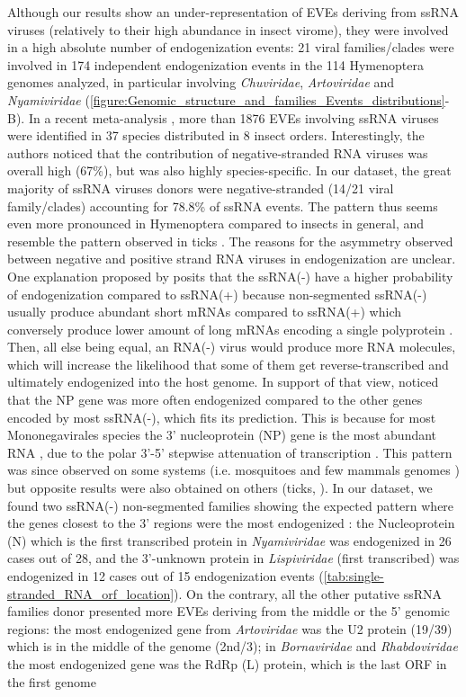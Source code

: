 Although our results show an under-representation of EVEs deriving from ssRNA viruses (relatively to their high abundance in insect virome), they were involved in a high absolute number of endogenization events: 21 viral families/clades were involved in 174 independent endogenization events in the 114 Hymenoptera genomes analyzed, in particular involving \textit{Chuviridae}, \textit{Artoviridae} and \textit{Nyamiviridae} (\figurename{\ref{figure:Genomic_structure_and_families_Events_distributions}-B}). In a recent meta-analysis \citep{gilbert_diversity_2022}, more than 1876 EVEs involving ssRNA viruses were identified in 37 species distributed in 8 insect orders. Interestingly, the authors noticed that the contribution of negative-stranded RNA viruses was overall high (67\%), but was also highly species-specific. In our dataset, the great majority of ssRNA viruses donors were negative-stranded (14/21 viral family/clades) accounting for 78.8\% of ssRNA events. The pattern thus seems even more pronounced in Hymenoptera compared to insects in general, and resemble the pattern observed in ticks \citep{russo_novel_2019}. The reasons for the asymmetry observed between negative and positive strand RNA viruses in endogenization are unclear. One explanation proposed by \citep{holmes_evolution_2011} posits that the ssRNA(-) have a higher probability of endogenization compared to ssRNA(+) because non-segmented ssRNA(-) usually produce abundant short mRNAs compared to ssRNA(+) which conversely produce lower amount of long mRNAs encoding a single polyprotein \citep{modrow_viruses_2013}. Then, all else being equal, an RNA(-) virus would produce more RNA molecules, which will increase the likelihood that some of them get reverse-transcribed and ultimately endogenized into the host genome. In support of that view, \citep{holmes_evolution_2011} noticed that the NP gene was more often endogenized compared to the other genes encoded by most ssRNA(-), which fits its prediction. This is because  for most Mononegavirales species the 3' nucleoprotein (NP) gene is the most abundant RNA \citep{compans_transcription_2004}, due to the polar 3'-5' stepwise attenuation of transcription \citep{compans_transcription_2004}. This pattern was since observed on some systems (i.e. mosquitoes and few mammals genomes \citep{katzourakis_endogenous_2010}) but opposite results were also obtained on others (ticks, \citep{russo_novel_2019}). In our dataset, we found two ssRNA(-) non-segmented families showing the expected pattern where the genes closest to the 3' regions were the most endogenized : the Nucleoprotein (N) which is the first transcribed protein in \textit{Nyamiviridae} was endogenized in 26 cases out of 28, and the 3'-unknown protein in \textit{Lispiviridae} (first transcribed) was endogenized in 12 cases out of 15 endogenization events (\tablename{\ref{tab:single-stranded_RNA_orf_location}}). On the contrary, all the other putative  ssRNA families donor presented more EVEs deriving from the middle or the 5' genomic regions: the most endogenized gene from \textit{\textit{Artoviridae}} was the U2 protein (19/39) which is in the middle of the genome (2nd/3); in \textit{Bornaviridae} and \textit{Rhabdoviridae} the most endogenized gene was the RdRp (L) protein, which is the last ORF in the first genome 